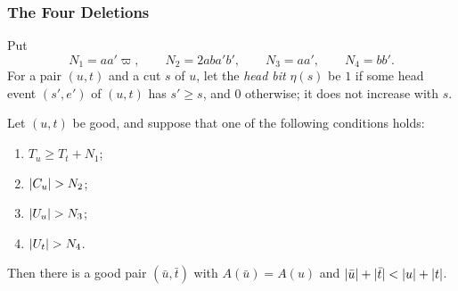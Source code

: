 \subsubsection{The Four Deletions}

Put
\[
 N_1=aa'\varpi,\qquad N_2=2aba'b',\qquad N_3=aa',\qquad N_4=bb' .
\]
For a pair $(u,t)$ and a cut $s$ of $u$, let the \emph{head bit} $\eta(s)$ be
$1$ if some head event $(s',e')$ of $(u,t)$ has $s'\ge s$, and $0$ otherwise;
it does not increase with $s$.

\begin{lemma}\label{lem:nm-four}
Let $(u,t)$ be good, and suppose that one of the following conditions holds:
\begin{enumerate}[label=(\arabic*)]
\item $T_u\ge T_t+N_1$;
\item $\lvert C_u\rvert>N_2$;
\item $\lvert U_u\rvert>N_3$;
\item $\lvert U_t\rvert>N_4$.
\end{enumerate}
Then there is a good pair $(\bar u,\bar t)$ with $A(\bar u)=A(u)$ and
$\lvert \bar u\rvert+\lvert \bar t\rvert<\lvert u\rvert+\lvert t\rvert$.
\end{lemma}

